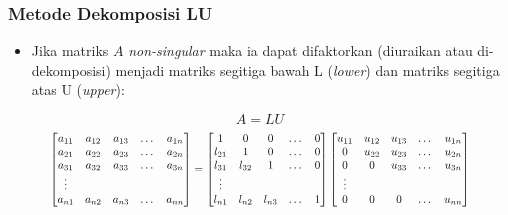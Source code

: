 \documentclass[pdflatex,compress,mathserif]{beamer}
\newcommand*{\Scale}[2][4]{\scalebox{#1}{$#2$}}%
\begin{document}
\begin{frame}
	\frametitle{Metode Dekomposisi LU}
	\begin{itemize}
		\item Jika matriks $ A $ \textit{non-singular} maka ia dapat difaktorkan (diuraikan atau di-dekomposisi) menjadi matriks segitiga bawah L (\textit{lower}) dan matriks segitiga atas U (\textit{upper}):
	\end{itemize}
	\[ A = LU \]
	\[\Scale[0.8]{
	\begin{bmatrix}
		a_{11} & a_{12} & a_{13} & \dots & a_{1n} \\
		a_{21} & a_{22} & a_{23} & \dots & a_{2n} \\
		a_{31} & a_{32} & a_{33} & \dots & a_{3n} \\
		\vdots \\
		a_{n1} & a_{n2} & a_{n3} & \dots & a_{nn} \\
	\end{bmatrix}
	=
	\begin{bmatrix}
		1 & 0 & 0 & \dots & 0 \\
		l_{21} & 1 & 0 & \dots & 0 \\
		l_{31} & l_{32} & 1 & \dots & 0 \\
		\vdots \\
		l_{n1} & l_{n2} & l_{n3} & \dots & 1 \\
	\end{bmatrix}
	\begin{bmatrix}
		u_{11} & u_{12} & u_{13} & \dots & u_{1n} \\
		0 & u_{22} & u_{23} & \dots & u_{2n} \\
		0 & 0 & u_{33} & \dots & u_{3n} \\
		\vdots \\
		0 & 0 & 0 & \dots & u_{nn} \\
	\end{bmatrix}
	}\]
\end{frame}
\end{document}
